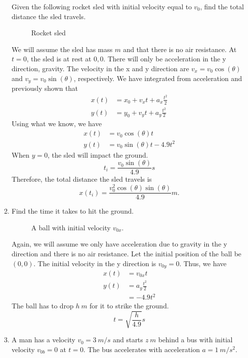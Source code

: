 \begin{enumerate}
  Given the following rocket sled with initial velocity equal to \(v_0\), find
  the total distance the sled travels.
  \begin{figure}[H]
    \centering
    
    \caption{Rocket sled}
  \end{figure}
  We will assume the sled has mass \(m\) and that there is no air resistance.
  At \(t = 0\), the sled is at rest at \(0, 0\).
  There will only be acceleration in the y direction, gravity.
  The velocity in the x and y direction are \(v_x = v_0\cos(\theta)\) and
  \(v_y = v_0\sin(\theta)\), respectively.
  We have integrated from acceleration and previously shown that
  \begin{align*}
    x(t) &= x_0 + v_xt + a_x\frac{t^2}{2}\\
    y(t) &= y_0 + v_yt + a_y\frac{t^2}{2}
  \end{align*}
  Using what we know, we have
  \begin{align*}
    x(t) &= v_0\cos(\theta)t\\
    y(t) &= v_0\sin(\theta)t - 4.9t^2
  \end{align*}
  When \(y = 0\), the sled will impact the ground.
  \[
  t_i = \frac{v_0\sin(\theta)}{4.9}s
  \]
  Therefore, the total distance the sled travels is
  \[
  x(t_i) = \frac{v_0^2\cos(\theta)\sin(\theta)}{4.9}m.
  \]
\item
  Find the time it takes to hit the ground.
  \begin{figure}[H]
    \centering
    
    \caption{A ball with initial velocity \(v_{0x}\).}
  \end{figure}
  Again, we will assume we only have acceleration due to gravity in the y
  direction and there is no air resistance.
  Let the initial position of the ball be \((0, 0)\).
  The initial velocity in the y direction is \(v_{0y} = 0\).
  Thus, we have
  \begin{align*}
    x(t) &= v_{0x}t\\
    y(t) &= a_y\frac{t^2}{2}\\
         &= -4.9t^2
  \end{align*}
  The ball has to drop \(h \ m\) for it to strike the ground.
  \[
  t = \sqrt{\frac{h}{4.9}}s
  \]
\item
  A man has a velocity \(v_0 = 3 \ m/s\) and starts \(z \ m\) behind a bus with
  initial velocity \(v_{0b} = 0\) at \(t = 0\).
  The bus accelerates with acceleration \(a = 1 \ m/s^2\).

\end{enumerate}
